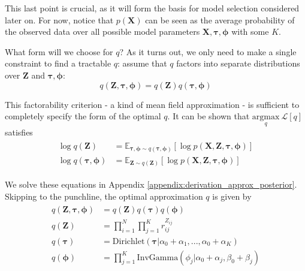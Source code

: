 \documentclass{article}
\let\vec\boldsymbol
\begin{document}
This last point is crucial, as it will form the basis for model selection considered later on. For now, notice that $p(\vec{X})$ can be seen as the average probability of the observed data over all possible model parameters $\vec{X}, \boldsymbol{\tau}, \boldsymbol{\phi}$ with some $K$. \newline

What form will we choose for $q$? As it turns out, we only need to make a
single constraint to find a tractable $q$: assume that $q$ factors into
separate distributions over $\vec{Z}$ and $\boldsymbol{\tau}, \boldsymbol{\phi}$:
\[
    q \left( \vec{Z}, \boldsymbol{\tau}, \boldsymbol{\phi} \right) = q \left( \vec{Z} \right) q \left( \boldsymbol{\tau}, \boldsymbol{\phi} \right)
\]

This factorability criterion - a kind of mean field approximation - is sufficient
to completely specify the form of the optimal $q$. It can be shown \cite{bishop2006}
that $\underset{q}{\text{argmax}} \: \mathcal{L}[q]$ satisfies
\begin{align}\begin{split}\label{eq:em_equations}
    \log q \left( \vec{Z} \right) &= \mathbb{E}_{\boldsymbol{\tau}, \boldsymbol{\phi} \sim q (\boldsymbol{\tau}, \boldsymbol{\phi})} \left[ \log p \left( \vec{X}, \vec{Z}, \boldsymbol{\tau}, \boldsymbol{\phi} \right) \right] \\
    \log q \left( \boldsymbol{\tau}, \boldsymbol{\phi} \right) &= \mathbb{E}_{\vec{Z} \sim q(\vec{Z})} \left[ \log p \left( \vec{X}, \vec{Z}, \boldsymbol{\tau}, \boldsymbol{\phi} \right) \right]
\end{split}\end{align}

We solve these equations in Appendix \ref{appendix:derivation_approx_posterior}.
Skipping to the punchline, the optimal approximation $q$ is given by
\begin{align}\begin{split}
    q \left( \vec{Z}, \boldsymbol{\tau}, \boldsymbol{\phi} \right) &= q \left( \vec{Z} \right) q \left( \boldsymbol{\tau} \right) q \left( \boldsymbol{\phi} \right) \\
    q \left( \vec{Z} \right) &= \prod\limits_{i=1}^{N} \prod\limits_{j=1}^{K} r_{ij}^{Z_{ij}} \\
    q \left( \boldsymbol{\tau} \right) &= \text{Dirichlet} \left(
        \boldsymbol{\tau} | \alpha_{0} + \alpha_{1}, ..., \alpha_{0} + \alpha_{K}
    \right) \\
    q \left( \boldsymbol{\phi} \right) &= \prod\limits_{j=1}^{K} \text{InvGamma} \left(
        \phi_{j} | \alpha_{0} + \alpha_{j}, \beta_{0} + \beta_{j}
    \right)
\end{split}\end{align}
\end{document}
